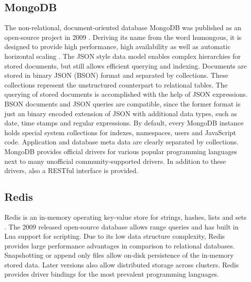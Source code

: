 \subsection{MongoDB}
The non-relational, document-oriented database MongoDB was published as an open-source project in 2009 \cite{Eliot:2010}. Deriving its name from the word humongous, it is designed to provide high performance, high availability as well as automatic horizontal scaling \cite{MongoDB_Intro:2016}. The JSON style data model enables complex hierarchies for stored documents, but still allows efficient querying and indexing. Documents are stored in binary JSON (BSON) format and separated by collections. These collections represent the unstructured counterpart to relational tables. The querying of stored documents is accomplished with the help of JSON expressions. BSON documents and JSON queries are compatible, since the former format is just an binary encoded extension of JSON with additional data types, such as date, time stamps and regular expressions. By default, every MongoDB instance holds special system collections for indexes, namespaces, users and JavaScript code. Application and database meta data are clearly separated by collections. MongoDB provides official drivers for various popular programming languages next to many unofficial community-supported drivers. In addition to these drivers, also a RESTful interface is provided.

\subsection{Redis}
Redis is an in-memory operating key-value store for strings, hashes, lists and sets \cite{Sanfilippo:2016}. The 2009 released open-source database allows range queries and has built in Lua support for scripting. Due to its low data structure complexity, Redis provides large performance advantages in comparison to relational databases. Snapshotting or append only files allow on-disk persistence of the in-memory stored data. Later versions also allow distributed storage across clusters. Redis provides driver bindings for the most prevalent programming languages.

